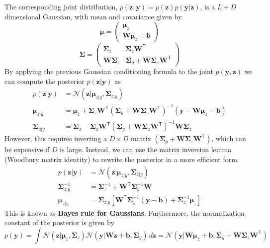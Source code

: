 \documentclass[11pt]{article}
\begin{document}
The corresponding joint distribution, $p(\boldsymbol{z}, \boldsymbol{y}) = p(\boldsymbol{z}) p(\boldsymbol{y} | \boldsymbol{z})$, is a $L + D$ dimensional Gaussian, with mean and covariance given by
\[
\boldsymbol{\mu} = \begin{pmatrix} \boldsymbol{\mu}_z \\ \mathbf{W} \boldsymbol{\mu}_z + \boldsymbol{b} \end{pmatrix}
\]
\[
\boldsymbol{\Sigma} = \begin{pmatrix} \boldsymbol{\Sigma}_z & \boldsymbol{\Sigma}_z \mathbf{W}^\mathsf{T} \\ \mathbf{W} \boldsymbol{\Sigma}_z & \boldsymbol{\Sigma}_y + \mathbf{W} \boldsymbol{\Sigma}_z \mathbf{W}^\mathsf{T} \end{pmatrix}
\]
By applying the previous Gaussian conditioning formula to the joint $p(\boldsymbol{y}, \boldsymbol{z})$ we can compute the posterior $p(\boldsymbol{z} | \boldsymbol{y})$ as
\[
\begin{aligned}
p(\boldsymbol{z} | \boldsymbol{y}) &= \mathcal{N}(\boldsymbol{z} | \boldsymbol{\mu}_{z|y}, \boldsymbol{\Sigma}_{z|y}) \\
\boldsymbol{\mu}_{z|y} &= \boldsymbol{\mu}_z + \boldsymbol{\Sigma}_z \mathbf{W}^\mathsf{T} (\boldsymbol{\Sigma}_y + \mathbf{W} \boldsymbol{\Sigma}_z \mathbf{W}^\mathsf{T})^{-1} (\mathbf{y} - \mathbf{W} \boldsymbol{\mu}_z - \mathbf{b}) \\
\boldsymbol{\Sigma}_{z|y} &= \boldsymbol{\Sigma}_z - \boldsymbol{\Sigma}_z \mathbf{W}^\mathsf{T} (\boldsymbol{\Sigma}_y + \mathbf{W} \boldsymbol{\Sigma}_z \mathbf{W}^\mathsf{T})^{-1} \mathbf{W} \boldsymbol{\Sigma}_z
\end{aligned}
\]
However, this requires inverting a $D \times D$ matrix $(\boldsymbol{\Sigma}_y + \mathbf{W} \boldsymbol{\Sigma}_z \mathbf{W}^\mathsf{T})$, which can be expensive if $D$ is large. Instead, we can use the matrix inversion lemma (Woodbury matrix identity) to rewrite the posterior in a more efficient form:
\[
\boxed{
\begin{aligned}
p(\boldsymbol{z} | \boldsymbol{y}) &= \mathcal{N}(\boldsymbol{z} | \boldsymbol{\mu}_{z|y}, \boldsymbol{\Sigma}_{z|y}) \\
\boldsymbol{\Sigma}_{z|y}^{-1} &= \boldsymbol{\Sigma}_z^{-1} + \mathbf{W}^\mathsf{T} \boldsymbol{\Sigma}_y^{-1} \mathbf{W} \\
\boldsymbol{\mu}_{z|y} &= \boldsymbol{\Sigma}_{z|y} \left[ \mathbf{W}^\mathsf{T} \boldsymbol{\Sigma}_y^{-1} (\boldsymbol{y} - \boldsymbol{b}) + \boldsymbol{\Sigma}_z^{-1} \boldsymbol{\mu}_z \right]
\end{aligned}
}
\]
This is known as \textbf{Bayes rule for Gaussians}. Furthermore, the normalization constant of the posterior is given by
\[
p(\boldsymbol{y}) = \int \mathcal{N}(\boldsymbol{z} | \boldsymbol{\mu}_z, \boldsymbol{\Sigma}_z) \mathcal{N}(\boldsymbol{y} | \mathbf{W}\boldsymbol{z} + \boldsymbol{b}, \boldsymbol{\Sigma}_y) \, d\boldsymbol{z} = \mathcal{N}(\boldsymbol{y} | \mathbf{W}\boldsymbol{\mu}_z + \boldsymbol{b}, \boldsymbol{\Sigma}_y + \mathbf{W} \boldsymbol{\Sigma}_z \mathbf{W}^\mathsf{T})
\]
\end{document}
